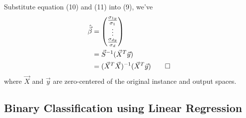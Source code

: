 \documentclass{article}
\begin{document}
Substitute equation (10) and (11) into (9), we've
\begin{align}
    \hat{\Vec{\beta}} &= 
    \begin{pmatrix}
    \frac{\sigma_{1y}}{\sigma_{1}} \\
    \vdots \\
    \frac{\sigma_{dy}}{\sigma_{d}} 
    \end{pmatrix} \nonumber \\
    &=
    \Vec{S}^{-1}(\Vec{X}^T\Vec{y}) \nonumber \\
    &=
    (\Vec{X}^T\Vec{X})^{-1}(\Vec{X}^T\Vec{y}) \qed
\end{align} where $\Vec{X}$ and $\Vec{y}$ are zero-centered of the original instance and output spaces.

\subsection{Binary Classification using Linear Regression}
\end{document}
